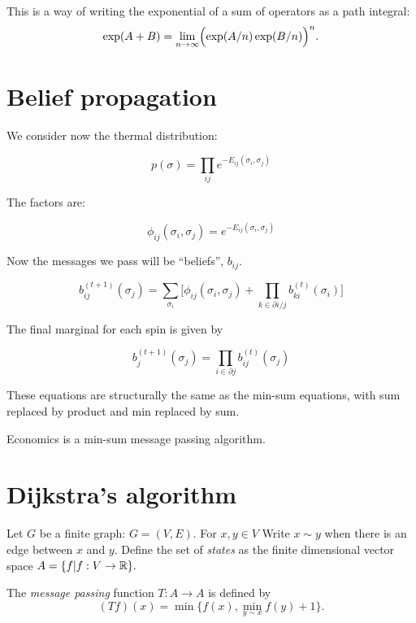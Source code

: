 \documentclass[11pt]{article}
\begin{document}
This is a way of writing the exponential of a sum of operators
as a path integral:
$$
\exp(A+B) = \lim_{n\to\infty} \Bigl(\exp(A/n)\exp(B/n)\Bigr)^n.
$$
 

\section{Belief propagation}



We consider now the thermal distribution:

$$
    p(\sigma) = \prod_{ij} e^{-E_{ij}(\sigma_i, \sigma_j)}
$$

The factors are:

$$
\phi_{ij}(\sigma_i, \sigma_j) = e^{-E_{ij}(\sigma_i, \sigma_j)}
$$

Now the messages we pass will be ``beliefs'', $b_{ij}$.

$$
b_{ij}^{(t+1)}(\sigma_j) = \sum_{\sigma_i}\bigl[ \phi_{ij}(\sigma_i, \sigma_j)
  + \prod_{k\in \partial i/j} b_{ki}^{(t)}(\sigma_i) \bigr]
$$

The final marginal for each spin is given by

$$
    b_j^{(t+1)}(\sigma_j) = \prod_{i\in \partial j} b_{ij}^{(t)}(\sigma_j)
$$

These equations are structurally the same as the
min-sum equations, with sum replaced by product and
min replaced by sum.




Economics is a min-sum message passing algorithm.


%
%

\section{Dijkstra's algorithm}

Let $G$ be a finite graph: $G = (V, E).$
For $x,y\in V$ Write $x\sim y$ when there
is an edge between $x$ and $y.$ %
Define the set of \emph{states} as %
the finite dimensional vector space
$A = \{ f | f : V \to \mathbb R \}.$

The \emph{message passing} function
$T:A\to A$ is defined by
$$(Tf)(x) = \min\{f(x), \min_{y\sim x} f(y)+1\}.$$
\end{document}
